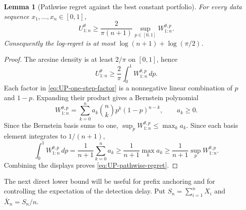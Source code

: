 \documentclass[12pt]{article}
\theoremstyle{spaced}
\newtheorem{lemma}[lemma]{Lemma}
\theoremstyle{remark}
\begin{document}
\begin{lemma}[Pathwise regret against the best constant portfolio]
\label{lem:UP-pathwise-regret}
For every data sequence $x_1,\ldots,x_n\in[0,1]$,
\begin{equation}
\label{eq:UP-pathwise-regret}
 U_{1:n}^{\theta}
 \ge \frac{2}{\pi(n+1)}
      \sup_{p\in[0,1]}W_{1:n}^{\theta,p}.
\end{equation}
Consequently the log-regret is at most
$\log(n+1)+\log(\pi/2)$.
\end{lemma}
\begin{proof}
The arcsine density is at least $2/\pi$ on $[0,1]$, hence
\[
 U_{1:n}^{\theta}\ge\frac2\pi\int_0^1W_{1:n}^{\theta,p}\,dp.
\]
Each factor in \eqref{eq:UP-one-step-factor} is a nonnegative linear
combination of $p$ and $1-p$.  Expanding their product gives a Bernstein
polynomial
\[
 W_{1:n}^{\theta,p}
 =\sum_{k=0}^n a_k{n\choose k}p^k(1-p)^{n-k},
 \qquad a_k\ge0.
\]
Since the Bernstein basis sums to one,
$\sup_pW_{1:n}^{\theta,p}\le\max_k a_k$.  Since each basis element integrates
to $1/(n+1)$,
\[
 \int_0^1W_{1:n}^{\theta,p}\,dp
 =\frac1{n+1}\sum_{k=0}^na_k
 \ge\frac1{n+1}\max_ka_k\geq \frac1{n+1}\sup_pW_{1:n}^{\theta,p}.
\]
Combining the displays proves \eqref{eq:UP-pathwise-regret}.
\end{proof}

The next direct lower bound will be useful for prefix anchoring and for
controlling the expectation of the detection delay.  Put
$S_n=\sum_{i=1}^nX_i$ and $\bar X_n=S_n/n$.
\end{document}
